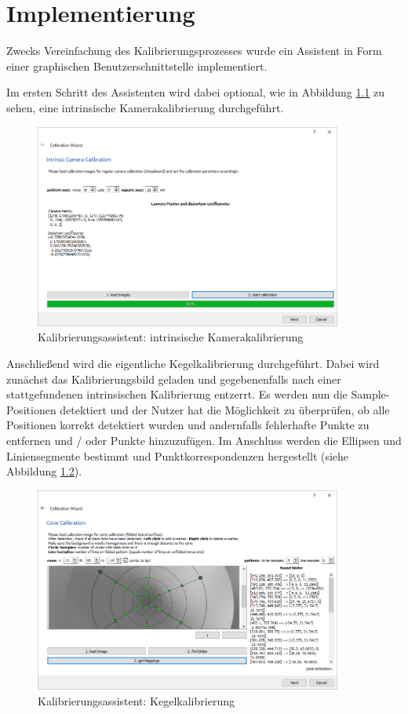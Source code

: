 \chapter{Implementierung}
\label{ch:implementation}

Zwecks Vereinfachung des Kalibrierungsprozesses wurde ein Assistent in Form einer graphischen Benutzerschnittstelle implementiert.

Im ersten Schritt des Assistenten wird dabei optional, wie in Abbildung \ref{fig:wizard1} zu sehen, eine intrinsische Kamerakalibrierung durchgeführt.
\begin{figure}[!htb]
	\centering
	\includegraphics[width=0.9\textwidth]{images/GUI/calibWizard1_1.PNG}
	\caption{Kalibrierungsassistent: intrinsische Kamerakalibrierung}
	\label{fig:wizard1}
\end{figure}

Anschließend wird die eigentliche Kegelkalibrierung durchgeführt. Dabei wird zunächst das Kalibrierungsbild geladen und gegebenenfalls nach einer stattgefundenen intrinsischen Kalibrierung entzerrt. Es werden nun die Sample-Positionen detektiert und der Nutzer hat die Möglichkeit zu überprüfen, ob alle Positionen korrekt detektiert wurden und andernfalls fehlerhafte Punkte zu entfernen und / oder Punkte hinzuzufügen. Im Anschluss werden die Ellipsen und Liniensegmente bestimmt und Punktkorrespondenzen hergestellt (siehe Abbildung \ref{fig:wizard2}).

\begin{figure}[!htb]
	\centering
	\includegraphics[width=0.9\textwidth]{images/GUI/calibWizard2_1.PNG}
	\caption{Kalibrierungsassistent: Kegelkalibrierung}
	\label{fig:wizard2}
\end{figure}


